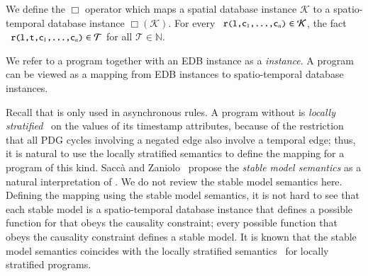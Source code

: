 We define the $\Box$ operator which maps a spatial database instance $\mathcal{K}$ to a spatio-temporal database instance $\mathcal{\Box(\mathcal{K})}$.  For every \linebreak $\dedalus{r(l,c\sub{1},\ldots,c\sub{n})} \in \mathcal{K}$,  the fact $\dedalus{r(l,t,c\sub{1},\ldots,c\sub{n})} \in \mathcal{T}$ for all $\mathcal{T} \in \mathbb{N}$.

We refer to a \lang program together with an EDB instance as a {\em \lang instance}.  A \lang program can be viewed as a mapping from EDB instances to spatio-temporal database instances.

Recall that  is only used in asynchronous rules.  A \lang program without  is {\em locally stratified}~\cite{local-strat} on the values of its timestamp attributes, because of the restriction that all PDG cycles involving a negated edge also involve a temporal edge; thus, it is natural to use the locally stratified semantics to define the mapping for a \lang program of this kind.  Sacc\`{a} and Zaniolo~\cite{sacca-zaniolo} propose the {\em stable model semantics} as a natural interpretation of .  We do not review the stable model semantics here.    Defining the mapping using the stable model semantics, it is not hard to see that each stable model is a spatio-temporal database instance that defines a possible function for  that obeys the causality constraint; every possible function that obeys the causality constraint defines a stable model.    It is known that the stable model semantics coincides with the locally stratified semantics~\cite{stable-model} for locally stratified programs.


